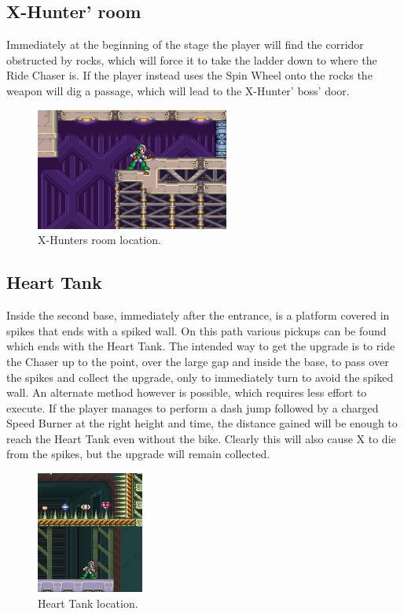 \subsection{X-Hunter' room}
Immediately at the beginning of the stage the player will find the corridor obstructed by rocks, which will force it to take the ladder down to where the Ride Chaser is. If the player instead uses the Spin Wheel onto the rocks the weapon will dig a passage, which will lead to the X-Hunter' boss' door.

\begin{figure}[htp]
	\centering
	\includegraphics[height=4cm]{figures/X2/Overdrive_ostrich/Ostrich_Hunter_room.png}
	\caption{X-Hunters room location.}
\end{figure}

\subsection{Heart Tank}
Inside the second base, immediately after the entrance, is a platform covered in spikes that ends with a spiked wall. On this path various pickups can be found which ends with the Heart Tank. The intended way to get the upgrade is to ride the Chaser up to the point, over the large gap and inside the base, to pass over the spikes and collect the upgrade, only to immediately turn to avoid the spiked wall. An alternate method however is possible, which requires less effort to execute. If the player manages to perform a dash jump followed by a charged Speed Burner at the right height and time, the distance gained will be enough to reach the Heart Tank even without the bike. Clearly this will also cause X to die from the spikes, but the upgrade will remain collected.
\begin{figure}[htp]
	\centering
	\includegraphics[height=4cm]{figures/X2/Overdrive_ostrich/Ostrich_heart.png}
	\caption{Heart Tank location.}
\end{figure}

